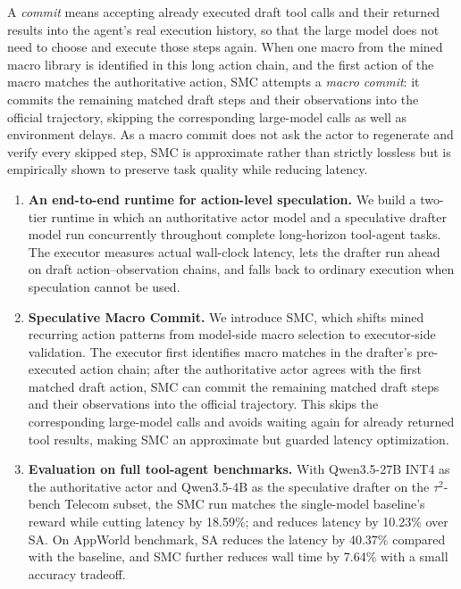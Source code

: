 A \emph{commit} means accepting already executed draft tool calls and their returned results into the agent's real execution history, so that the large model does not need to choose and execute those steps again. 
When one macro from the mined macro library is identified in this long action chain, and the first action of the macro matches the authoritative action, SMC attempts a \emph{macro commit}: it commits the remaining matched draft steps and their observations into the official trajectory, skipping the corresponding large-model calls as well as environment delays. 
As a macro commit does not ask the actor to regenerate and verify every skipped step, SMC is approximate rather than strictly lossless but is empirically shown to preserve task quality while reducing latency.

\begin{enumerate}
    \item \textbf{An end-to-end runtime for action-level speculation.} 
    We build a two-tier runtime in which an authoritative actor model and a speculative drafter model run concurrently throughout complete long-horizon tool-agent tasks.
    The executor measures actual wall-clock latency, lets the drafter run ahead on draft action--observation chains, and falls back to ordinary execution when speculation cannot be used.
    \item \textbf{Speculative Macro Commit.} 
    We introduce SMC, which shifts mined recurring action patterns from model-side macro selection to executor-side validation.
    The executor first identifies macro matches in the drafter's pre-executed action chain; after the authoritative actor agrees with the first matched draft action, SMC can commit the remaining matched draft steps and their observations into the official trajectory.
    This skips the corresponding large-model calls and avoids waiting again for already returned tool results, making SMC an approximate but guarded latency optimization.

    \item \textbf{Evaluation on full tool-agent benchmarks.} 
    With Qwen3.5-27B INT4 as the authoritative actor and Qwen3.5-4B as the speculative drafter on the $\tau^2$-bench Telecom subset, the SMC run matches the single-model baseline's reward while cutting latency by 18.59\%; and reduces latency by 10.23\% over SA. On AppWorld benchmark, SA reduces the latency by 40.37\% compared with the baseline, and SMC further reduces wall time by 7.64\% with a small accuracy tradeoff. 
\end{enumerate}
